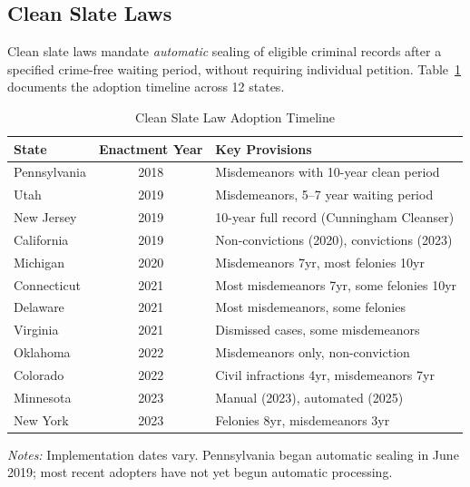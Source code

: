 \documentclass[12pt]{article}
\begin{document}
\subsection{Clean Slate Laws}

Clean slate laws mandate \emph{automatic} sealing of eligible criminal records after a specified crime-free waiting period, without requiring individual petition. Table~\ref{tab:adoption} documents the adoption timeline across 12 states.

\begin{table}[H]
\centering
\caption{Clean Slate Law Adoption Timeline}
\begin{threeparttable}
\begin{tabular}{lcl}
\toprule
State & Enactment Year & Key Provisions \\
\midrule
Pennsylvania & 2018 & Misdemeanors with 10-year clean period \\
Utah & 2019 & Misdemeanors, 5--7 year waiting period \\
New Jersey & 2019 & 10-year full record (Cunningham Cleanser) \\
California & 2019 & Non-convictions (2020), convictions (2023) \\
Michigan & 2020 & Misdemeanors 7yr, most felonies 10yr \\
Connecticut & 2021 & Most misdemeanors 7yr, some felonies 10yr \\
Delaware & 2021 & Most misdemeanors, some felonies \\
Virginia & 2021 & Dismissed cases, some misdemeanors \\
Oklahoma & 2022 & Misdemeanors only, non-conviction \\
Colorado & 2022 & Civil infractions 4yr, misdemeanors 7yr \\
Minnesota & 2023 & Manual (2023), automated (2025) \\
New York & 2023 & Felonies 8yr, misdemeanors 3yr \\
\bottomrule
\end{tabular}
\begin{tablenotes}[flushleft]
\small
\item \textit{Notes:} Implementation dates vary. Pennsylvania began automatic sealing in June 2019; most recent adopters have not yet begun automatic processing.
\end{tablenotes}
\end{threeparttable}
\label{tab:adoption}
\end{table}
\end{document}
